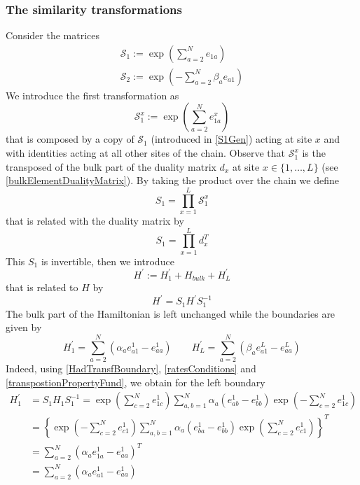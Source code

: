 \documentclass[11pt]{article}
\numberwithin{equation}{section}
\numberwithin{equation}{subsection}
\begin{document}
\subsubsection{The similarity transformations}\label{subsectionSTransf}
Consider the matrices
\begin{align}
	\mathcal{S}_{1}:=\exp{\left(\sum_{a=2}^{N}e_{1a}\right)}\label{S1Gen}\\
	\mathcal{S}_{2}:=\exp{\left(-\sum_{a=2}^{N}\beta_{a}e_{a1}\right)}\label{S2Gen}
\end{align}
We introduce the first transformation as
\begin{equation}\label{transformationV}
 \mathcal{S}_{1}^{x}:=\exp{\left(\sum_{a=2}^{N}e_{1a}^{x}\right)}%
\end{equation}
that is composed by a copy of $\mathcal{S}_{1}$ (introduced in \eqref{S1Gen}) acting at site $x$ and with identities acting at all other sites of the chain. 
Observe that $\mathcal{S}_{1}^{x}$ is the transposed of the bulk part of the duality matrix $d_{x}$  at site $x\in \{1,\ldots,L\}$ (see \eqref{bulkElementDualityMatrix}). By taking the product over the chain we define
\begin{equation}
    S_{1}=\prod_{x=1}^{L}\mathcal{S}_{1}^{x}
\end{equation}
that is related with the duality matrix by 
\begin{equation}
S_{1}=\prod_{x=1}^{L}d_{x}^{T}
\end{equation}
 This $S_{1}$ is invertible, then we introduce 
\begin{equation}\label{hatHamiltonian}
   H^{'}:=H^{'}_{1}+H_{bulk}+H^{'}_{L}
\end{equation}
that is related to $H$ by
\begin{equation}\label{similarV}
   H^{'}=S_{1}H^{'}S_{1}^{-1}
\end{equation}
The bulk part of the Hamiltonian is left unchanged while the boundaries are given by 
\begin{equation}
	H^{'}_{1}=\sum_{a=2}^{N}\left(\alpha_{a}e_{a1}^{1}-e_{aa}^{1}\right)\qquad H^{'}_{L}=\sum_{a=2}^{N}\left(\beta_{a}e_{a1}^{L}-e_{aa}^{L}\right)
\end{equation}
Indeed, using \eqref{HadTransfBoundary}, \eqref{ratesConditions} and \eqref{transpostionPropertyFund}, we obtain for the left boundary
\begin{equation}
	\begin{split}
		H_{1}^{'}&=S_{1}H_{1}S_{1}^{-1}=\exp{\left(\sum_{c=2}^{N}e_{1c}^{1}\right)}\sum_{a,b=1}^{N}\alpha_{a}\left(e_{ab}^{1}-e_{bb}^{1}\right)\exp{\left(-\sum_{c=2}^{N}e_{1c}^{1}\right)}
		\\&=
		\left\{\exp{\left(-\sum_{c=2}^{N}e_{c1}^{1}\right)}\sum_{a,b=1}^{N}\alpha_{a}\left(e_{ba}^{1}-e_{bb}^{1}\right)\exp{\left(\sum_{c=2}^{N}e_{c1}^{1}\right)}\right\}^{T}
		\\&=
		\sum_{a=2}^{N}\left(\alpha_{a}e_{1a}^{1}-e_{aa}^{1}\right)^{T}
		\\&=
		\sum_{a=2}^{N}\left(\alpha_{a}e_{a1}^{1}-e_{aa}^{1}\right)
	\end{split}
\end{equation}
\end{document}
